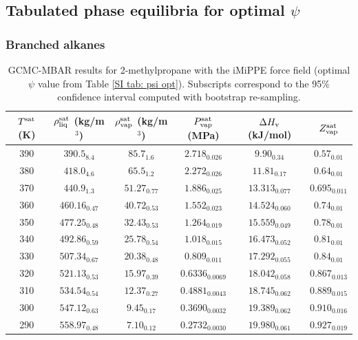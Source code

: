 \documentclass[journal=jctc,manuscript=article]{achemso}
\begin{document}
\subsection{Tabulated phase equilibria for optimal $\psi$}

\subsubsection{Branched alkanes}

\begin{table}[htb!]
	\caption{GCMC-MBAR results for 2-methylpropane with the iMiPPE force field (optimal $\psi$ value from Table \ref{SI tab: psi opt}). Subscripts correspond to the 95\% confidence interval computed with bootstrap re-sampling.}
	\begin{center}
		\begin{tabular}{|c|c|c|c|c|c|}
			\hline
			$T^{\rm sat}$ (K) & $\rho_{\rm liq}^{\rm sat}$ (kg/m$^3$) & $\rho_{\rm vap}^{\rm sat}$ (kg/m$^3$) & $P_{\rm vap}^{\rm sat}$ (MPa) & $\Delta H_{\rm v}$ (kJ/mol) & $Z_{\rm vap}^{\rm sat}$ \\ \hline
			390 & $390.5_{8.4}$ & $85.7_{1.6}$ & $2.718_{0.026}$ & $9.90_{0.34}$ & $0.57_{0.01}$ \\
			380 & $418.0_{4.6}$ & $65.5_{1.2}$ & $2.272_{0.026}$ & $11.81_{0.17}$ & $0.64_{0.01}$ \\
			370 & $440.9_{1.3}$ & $51.27_{0.77}$ & $1.886_{0.025}$ & $13.313_{0.077}$ & $0.695_{0.011}$ \\
			360 & $460.16_{0.47}$ & $40.72_{0.53}$ & $1.552_{0.023}$ & $14.524_{0.060}$ & $0.74_{0.01}$ \\
			350 & $477.25_{0.48}$ & $32.43_{0.53}$ & $1.264_{0.019}$ & $15.559_{0.049}$ & $0.78_{0.01}$ \\
			340 & $492.86_{0.59}$ & $25.78_{0.54}$ & $1.018_{0.015}$ & $16.473_{0.052}$ & $0.81_{0.01}$ \\
			330 & $507.34_{0.67}$ & $20.38_{0.48}$ & $0.809_{0.011}$ & $17.292_{0.055}$ & $0.84_{0.01}$ \\
			320 & $521.13_{0.53}$ & $15.97_{0.39}$ & $0.6336_{0.0069}$ & $18.042_{0.058}$ & $0.867_{0.013}$ \\
			310 & $534.54_{0.54}$ & $12.37_{0.27}$ & $0.4881_{0.0043}$ & $18.745_{0.062}$ & $0.889_{0.015}$ \\
			300 & $547.12_{0.63}$ & $9.45_{0.17}$ & $0.3690_{0.0032}$ & $19.389_{0.062}$ & $0.910_{0.016}$ \\
			290 & $558.97_{0.48}$ & $7.10_{0.12}$ & $0.2732_{0.0030}$ & $19.980_{0.061}$ & $0.927_{0.019}$ \\

\end{tabular}
\end{center}
\end{table}
\end{document}
